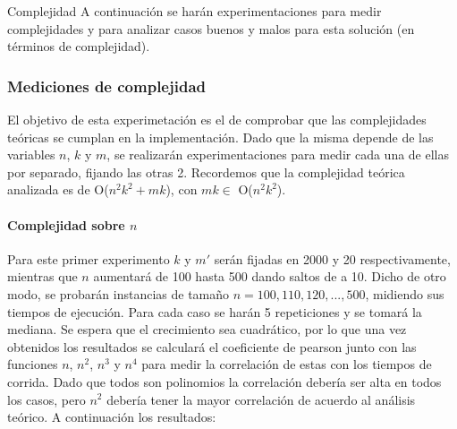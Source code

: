 \begin{subsection}{Complejidad}
A continuación se harán experimentaciones para medir complejidades y para analizar casos buenos y malos para esta solución (en términos de complejidad).

\subsubsection{Mediciones de complejidad}

El objetivo de esta experimetaci\'{o}n es el de comprobar que las complejidades te\'{o}ricas se cumplan en la implementaci\'{o}n. Dado que la misma depende de las variables $n$, $k$ y $m$, se realizarán experimentaciones para medir cada una de ellas por separado, fijando las otras 2. Recordemos que la complejidad teórica analizada es de O($n^2k^2 + mk$), con $mk \in$ O($n^2k^2$).

\paragraph{Complejidad sobre $n$}

Para este primer experimento $k$ y $m'$ serán fijadas en 2000 y 20 respectivamente, mientras que $n$ aumentará de 100 hasta 500 dando saltos de a 10. Dicho de otro modo, se probarán instancias de tamaño $n = 100, 110, 120, ..., 500$, midiendo sus tiempos de ejecución. Para cada caso se harán 5 repeticiones y se tomará la mediana. Se espera que el crecimiento sea cuadrático, por lo que una vez obtenidos los resultados se calculará el coeficiente de pearson junto con las funciones $n$, $n^2$, $n^3$ y $n^4$ para medir la correlación de estas con los tiempos de corrida. Dado que todos son polinomios la correlación debería ser alta en todos los casos, pero $n^2$ debería tener la mayor correlación de acuerdo al análisis teórico. A continuación los resultados:


\end{subsection}

